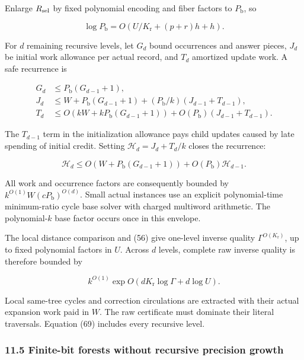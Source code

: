 Enlarge \(R_{\rm sel}\) by fixed polynomial encoding and fiber factors to \(P_{\mathrm b}\), so

\[
\log P_{\mathrm b}
 =O(U/K_{\mathrm r}+(p+r)h+h).
 \tag{66}
\]

For \(d\) remaining recursive levels, let \(G_d\) bound occurrences and answer pieces, \(J_d\) be initial work allowance per actual record, and \(T_d\) amortized update work. A safe recurrence is

\[
\begin{aligned}
 G_d&\leq P_{\mathrm b}(G_{d-1}+1),\\
 J_d&\leq W+P_{\mathrm b}(G_{d-1}+1)
        +(P_{\mathrm b}/k)(J_{d-1}+T_{d-1}),\\
 T_d&\leq O(kW+kP_{\mathrm b}(G_{d-1}+1))
                 +O(P_{\mathrm b})(J_{d-1}+T_{d-1}).
\end{aligned}
 \tag{67}
\]

The \(T_{d-1}\) term in the initialization allowance pays child updates caused by late spending of initial credit. Setting \(\mathcal H_d=J_d+T_d/k\) closes the recurrence:

\[
\mathcal H_d\leq
 O(W+P_{\mathrm b}(G_{d-1}+1))+O(P_{\mathrm b})\mathcal H_{d-1}.
 \tag{68}
\]

All work and occurrence factors are consequently bounded by \(k^{O(1)}W(cP_{\mathrm b})^{O(d)}\). Small actual instances use an explicit polynomial-time minimum-ratio cycle base solver with charged multiword arithmetic. The polynomial-\(k\) base factor occurs once in this envelope.

The local distance comparison and (56) give one-level inverse quality \(\Gamma^{O(K_{\mathrm r})}\), up to fixed polynomial factors in \(U\). Across \(d\) levels, complete raw inverse quality is therefore bounded by

\[
k^{O(1)}\exp O(dK_{\mathrm r}\log\Gamma+d\log U).
 \tag{69}
\]

Local same-tree cycles and correction circulations are extracted with their actual expansion work paid in \(W\). The raw certificate must dominate their literal traversals. Equation (69) includes every recursive level.

\hypertarget{af-46593eb93e-finite-bit-forests-without-recursive-precision-growth}{%
\subsubsection{11.5 Finite-bit forests without recursive precision growth}\label{af-46593eb93e-finite-bit-forests-without-recursive-precision-growth}}

